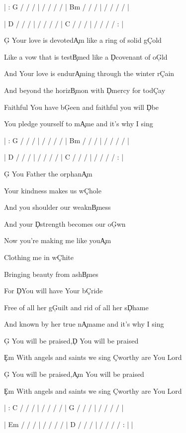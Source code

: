 \documentclass[9pt]{extarticle}
\begin{document}
\bsong

\bi
| : G / / /  |  / / / /  |  Bm / / /  |  / / / /  |

|  D / / /  |  / / / /  |  C / / /  |  / / / / : |
\ei

\bv
\c{G} Your love is devoted\c{Am} like a ring of solid g\c{C}old

Like a vow that is test\c{Bm}ed like a \c{D}covenant of o\c{G}ld

And Your love is endur\c{Am}ing through the winter r\c{C}ain

And beyond the horiz\c{Bm}on with \c{D}mercy for tod\c{C}ay
\ev

\bp
Faithful You have b\c{G}een and faithful you will \c{D}be

You pledge yourself to m\c{Am}e and it's why I sing
\ep

\bc
{}



\ec

\bin
| : G / / /  |  / / / /  |  Bm / / /  |  / / / /  |

|  D / / /  |  / / / /  |  C / / /  |  / / / / : |
\ein

\bv
\c{G} You Father the orphan\c{Am}

Your kindness makes us w\c{C}hole

And you shoulder our weakn\c{Bm}ess

And your \c{D}strength becomes our o\c{G}wn

Now you're making me like you\c{Am}

Clothing me in w\c{C}hite

Bringing beauty from ash\c{Bm}es

For \c{D}You will have Your b\c{C}ride
\ev

\bp
Free of all her g\c{G}uilt and rid of all her s\c{D}hame

And known by her true n\c{Am}ame and it's why I sing
\ep


\bb[2]
\c{G} You will be praised,\c{D} You will be praised

\c{Em} With angels and saints we sing \c{C}worthy are You Lord

\c{G} You will be praised,\c{Am} You will be praised

\c{Em} With angels and saints we sing \c{C}worthy are You Lord
\eb


\bo
| : C / / /  |  / / / /  |  G / / /  |  / / / /  |

|  Em / / /  |  / / / /  |  D / / /  |  / / / / : |  |
\eo

\esong
\end{document}
